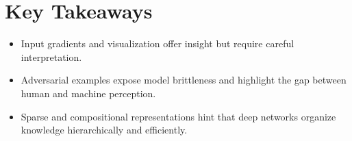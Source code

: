 \documentclass[12pt]{article}
\begin{document}
\section{Key Takeaways}
\begin{itemize}
		\item Input gradients and visualization offer insight but require careful interpretation.
		\item Adversarial examples expose model brittleness and highlight the gap between human and machine perception.
		\item Sparse and compositional representations hint that deep networks organize knowledge hierarchically and efficiently.
\end{itemize}
\end{document}
